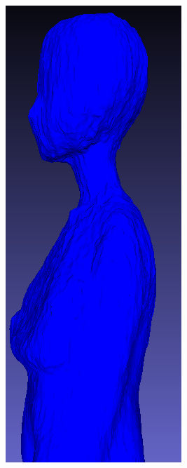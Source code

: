 \begin{figure}[H]
\begin{subfigure}[b]{0.106\textwidth}
        \caption{}
    \end{subfigure}
    \begin{subfigure}[b]{0.1289\textwidth}
        \centering
        \includegraphics[width=\textwidth]{etc/bias/bias_teacher_magic3d.png}

\end{subfigure}
\end{figure}
